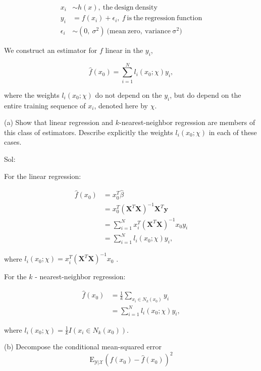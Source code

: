 \documentclass[english]{article}\usepackage[]{graphicx}\usepackage[]{color}
\begin{document}
\begin{align*}
x_{i} & \sim h(x),\ \mathrm{the\ design\ density}\\
y_{i} & =f(x_{i})+\epsilon_{i},\ f\ \mathrm{is\ the\ regression\ function}\\
\epsilon_{i} & \sim(0,\ \sigma^{2})\ (\mathrm{mean\ zero,\ variance\ \sigma^{2})}
\end{align*}

We construct an estimator for $f$ linear in the $y_{i}$,

\[
\hat{f}(x_{0})=\sum_{i=1}^{N}l_{i}(x_{0};\chi)y_{i},
\]

where the weights $l_{i}(x_{0};\chi)$ do not depend on the $y_{i}$,
but do depend on the entire training sequence of $x_{i}$, denoted
here by $\chi$.

\vspace{0.5cm}

(a) Show that linear regression and $k$-nearest-neighbor regression
are members of this class of estimators. Describe explicitly the weights
$l_{i}(x_{0};\chi)$ in each of these cases.

\vspace{0.5cm}

Sol:

For the linear regression:

\begin{align*}
\hat{f}(x_{0}) & =x_{0}^{T}\hat{\beta}\\
 & =x_{0}^{T}(\boldsymbol{X}^{T}\boldsymbol{X})^{-1}\boldsymbol{X}^{T}\boldsymbol{y}\\
 & =\sum_{i=1}^{N}x_{i}^{T}(\boldsymbol{X}^{T}\boldsymbol{X})^{-1}x_{0}y_{i}\\
 & =\sum_{i=1}^{N}l_{i}(x_{0};\chi)y_{i},
\end{align*}

where $l_{i}(x_{0};\chi)=x_{i}^{T}(\boldsymbol{X}^{T}\boldsymbol{X})^{-1}x_{0}$
.

For the $k$ - nearest-neighbor regression:

\begin{align*}
\hat{f}(x_{0}) & =\frac{1}{k}\sum_{x_{i}\in N_{k}(x_{0})}y_{i}\\
 & =\sum_{i=1}^{N}l_{i}(x_{0};\chi)y_{i},
\end{align*}

where $l_{i}(x_{0};\chi)=\frac{1}{k}I(x_{i}\in N_{k}(x_{0}))$.

\vspace{0.5cm}

(b) Decompose the conditional mean-squared error 
\[
\mathrm{E}_{\mathcal{Y}|\mathcal{X}}(f(x_{0})-\hat{f}(x_{0}))^{2}
\]
\end{document}
